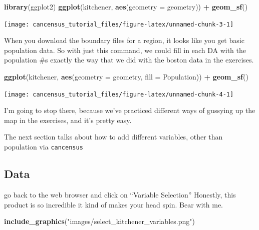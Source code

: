 \documentclass[
]{article}
\newenvironment{Shaded}{\begin{snugshade}}{\end{snugshade}}
\newcommand{\DataTypeTok}[1]{\textcolor[rgb]{0.13,0.29,0.53}{#1}}
\newcommand{\KeywordTok}[1]{\textcolor[rgb]{0.13,0.29,0.53}{\textbf{#1}}}
\newcommand{\NormalTok}[1]{#1}
\newcommand{\OperatorTok}[1]{\textcolor[rgb]{0.81,0.36,0.00}{\textbf{#1}}}
\newcommand{\StringTok}[1]{\textcolor[rgb]{0.31,0.60,0.02}{#1}}
\begin{document}
\begin{Shaded}
\begin{Highlighting}[]
\KeywordTok{library}\NormalTok{(ggplot2)}
\KeywordTok{ggplot}\NormalTok{(kitchener, }\KeywordTok{aes}\NormalTok{(}\DataTypeTok{geometry =}\NormalTok{ geometry)) }\OperatorTok{+}\StringTok{ }\KeywordTok{geom\_sf}\NormalTok{()}
\end{Highlighting}
\end{Shaded}

\begin{center}\texttt{[image: cancensus\_tutorial\_files/figure-latex/unnamed-chunk-3-1]} \end{center}

When you download the boundary files for a region, it looks like you get
basic population data. So with just this command, we could fill in each
DA with the population \#s exactly the way that we did with the boston
data in the exercises.

\begin{Shaded}
\begin{Highlighting}[]
\KeywordTok{ggplot}\NormalTok{(kitchener, }\KeywordTok{aes}\NormalTok{(}\DataTypeTok{geometry =}\NormalTok{ geometry, }\DataTypeTok{fill =}\NormalTok{ Population)) }\OperatorTok{+}\StringTok{ }\KeywordTok{geom\_sf}\NormalTok{()}
\end{Highlighting}
\end{Shaded}

\begin{center}\texttt{[image: cancensus\_tutorial\_files/figure-latex/unnamed-chunk-4-1]} \end{center}

I'm going to stop there, because we've practiced different ways of
gussying up the map in the exercises, and it's pretty easy.

The next section talks about how to add different variables, other than
population via \texttt{cancensus}

\hypertarget{data}{%
\subsection{Data}\label{data}}

go back to the web browser and click on ``Variable Selection'' Honestly,
this product is so incredible it kind of makes your head spin. Bear with
me.

\begin{Shaded}
\begin{Highlighting}[]
\KeywordTok{include\_graphics}\NormalTok{(}\StringTok{"images/select\_kitchener\_variables.png"}\NormalTok{)}
\end{Highlighting}
\end{Shaded}
\end{document}
